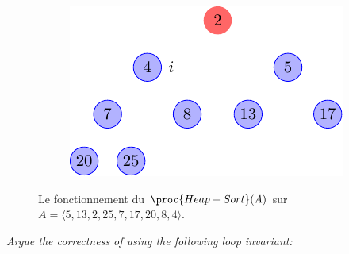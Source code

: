 \begin{description}
\begin{ex}
\begin{figure}[H]
\begin{subfigure}[t]{.30\textwidth}
          \centering
          \includegraphics[scale=0.8]{img/6_4-1/6_4-1_10}
          \caption{}\label{fig:6_4-1_10}
        \end{subfigure}
        \caption{Le fonctionnement du $\proc{Heap-Sort}(A)$ sur $A = \langle 5, 13, 2, 25, 7, 17, 20, 8, 4 \rangle$.} 
        \label{fig:Heap-Sort}
      \end{figure}
    \end{ex}
 {\itshape Argue the correctness of  using the following loop invariant:

}
\end{description}

